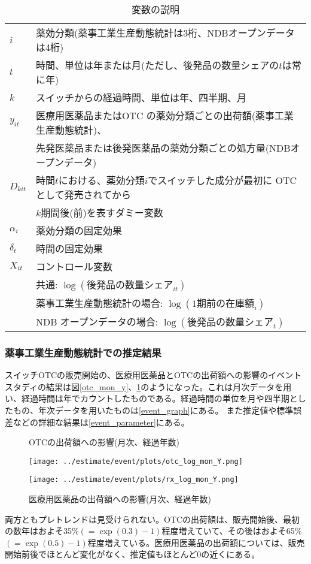\documentclass[a4paper,11pt,uplatex]{jsarticle}
\theoremstyle{definition}
\begin{document}
\begin{table}[H] \caption{変数の説明}\label{tab:event}
    \begin{tabular}{ll}
       \toprule 
       \(i\)&薬効分類(薬事工業生産動態統計は3桁、NDBオープンデータは4桁)\\
       \(t\)&時間、単位は年または月(ただし、後発品の数量シェアの\(t\)は常に年)\\
       \(k\)&スイッチからの経過時間、単位は年、四半期、月\\
    $y_{it}$ & 医療用医薬品またはOTC の薬効分類ごとの出荷額(薬事工業生産動態統計)、\\
    & 先発医薬品または後発医薬品の薬効分類ごとの処方量(NDBオープンデータ)\\
    $D_{kit}$ & 時間\(t\)における、薬効分類\(i\)でスイッチした成分が最初に OTC として発売されてから\\
    & \(k\)期間後(前)を表すダミー変数\\
    $\alpha_i$ & 薬効分類の固定効果\\
    $\delta_t$ & 時間の固定効果\\
    $X_{it}$ & コントロール変数\\
    & 共通: $\log(後発品の数量シェア_{it})$\\
    & 薬事工業生産動態統計の場合: $\log(1期前の在庫額_i)$\\
    & \textrm{NDB} オープンデータの場合: $\log(後発品の数量シェア_t)$ \\
    \bottomrule
    \end{tabular}
\end{table}
\subsubsection{薬事工業生産動態統計での推定結果}
スイッチOTCの販売開始の、医療用医薬品とOTCの出荷額への影響のイベントスタディの結果は図\ref{otc_mon_y}、\ref{rx_mon_y}のようになった。これは月次データを用い、経過時間は年でカウントしたものである。経過時間の単位を月や四半期としたもの、年次データを用いたものは\ref{event_graph}にある。
また推定値や標準誤差などの詳細な結果は\ref{event_parameter}にある。 
\begin{figure}[H]
    \centering
    \begin{minipage}{0.45\textwidth}
        \caption{OTCの出荷額への影響(月次、経過年数)}\label{otc_mon_y}
        \centering
        \texttt{[image: ../estimate/event/plots/otc\_log\_mon\_Y.png]}
    \end{minipage}\hfill
    \begin{minipage}{0.45\textwidth}
        \caption{医療用医薬品の出荷額への影響(月次、経過年数)}\label{rx_mon_y}
        \centering
        \texttt{[image: ../estimate/event/plots/rx\_log\_mon\_Y.png]}
    \end{minipage}
\end{figure}
両方ともプレトレンドは見受けられない。OTCの出荷額は、販売開始後、最初の数年はおよそ35\%\((=\exp(0.3)-1)\)程度増えていて、その後はおよそ65\%\((=\exp(0.5)-1)\)程度増えている。医療用医薬品の出荷額については、販売開始前後でほとんど変化がなく、推定値もほとんど0の近くにある。
\end{document}

